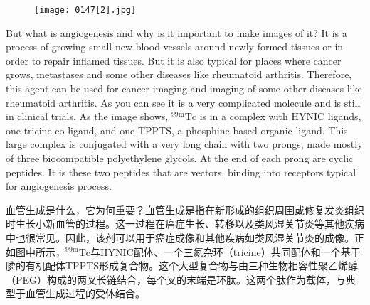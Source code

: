 \documentclass[dvipsnames, svgnames,a4paper,11pt]{article}
\begin{document}
\begin{figure}[h]
	\centering
    \texttt{[image: 0147[2].jpg]}    
     \label{fig158}
\end{figure}

But what is angiogenesis and why is it important to make images of it? It is a process
of growing small new blood vessels around newly formed tissues or in order to repair  inflamed tissues. But it is also typical for places where cancer grows, metastases
and some other diseases like rheumatoid arthritis. Therefore, this agent can be used
for cancer imaging and imaging of some other diseases like rheumatoid arthritis. As
you can see it is a very complicated molecule and is still in clinical trials. As the
image shows, ${}^\mathrm{99m}\mathrm{Tc}$ is in a complex with HYNIC ligands, one tricine co-ligand, and
one TPPTS, a phosphine-based organic ligand. This large complex is conjugated
with a very long chain with two prongs, made mostly of three biocompatible
polyethylene glycols. At the end of each prong are cyclic peptides. It is these two
peptides that are vectors, binding into receptors typical for angiogenesis process.

血管生成是什么，它为何重要？血管生成是指在新形成的组织周围或修复发炎组织时生长小新血管的过程。这一过程在癌症生长、转移以及类风湿关节炎等其他疾病中也很常见。因此，该剂可以用于癌症成像和其他疾病如类风湿关节炎的成像。正如图中所示，${}^\mathrm{99m}\mathrm{Tc}$与HYNIC配体、一个三氮杂环（tricine）共同配体和一个基于膦的有机配体TPPTS形成复合物。这个大型复合物与由三种生物相容性聚乙烯醇（PEG）构成的两叉长链结合，每个叉的末端是环肽。这两个肽作为载体，与典型于血管生成过程的受体结合。
\end{document}

